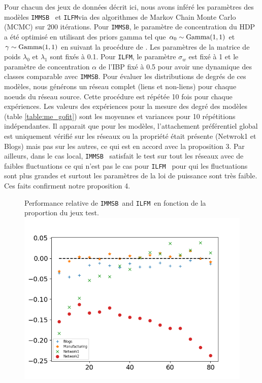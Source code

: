 \documentclass[french]{hermes-journal}
\renewcommand{\text}{\textnormal}
\newcommand{\ilfm}{\texttt{ILFM}}
\newcommand{\immsb}{\texttt{IMMSB}}
\begin{document}
Pour chacun des jeux de données décrit ici, nous avons inféré les paramètres des modèles \immsb~ et \ilfm via des algorithmes de Markov Chain Monte Carlo (MCMC) sur 200 itérations. Pour \immsb, le paramètre de concentration du HDP a été optimisé en utilisant des priors gamma tel que $\alpha_0 \sim \text{Gamma}(1,1)$ et $\gamma \sim \text{Gamma}(1,1)$ en suivant la procédure de \cite{HDP}. Les paramètres de la matrice de poids $\lambda_0$ et $\lambda_1$ sont fixés à 0.1. Pour \ilfm, le paramètre $\sigma_w$ est fixé à 1 et le paramètre de concentration $\alpha$ de l'IBP fixé à 0.5 pour avoir une dynamique des classes comparable avec \immsb. Pour évaluer les distributions de degrés de ces modèles, nous générons un réseau complet (liens et non-liens) pour chaque noeuds du réseau source. Cette procédure est répétée 10 fois pour chaque expériences. Les valeurs des expériences pour la mesure des degré des modèles (table \ref{table:me_gofit}) sont les moyennes et variances pour 10 répétitions indépendantes. 
Il apparait que pour les modèles, l'attachement préférentiel global est uniquement vérifié sur les réseaux ou la propriété était présente (Netwrok1 et Blogs) mais pas sur les autres, ce qui est en accord avec la proposition 3. Par ailleurs, dans le cas local, \immsb~ satisfait le test sur tout les réseaux avec de faibles fluctuations ce qui n'est pas le cas pour \ilfm~ pour qui les fluctuations sont plus grandes et surtout les paramètres de la loi de puissance sont très faible. Ces faits confirment notre proposition 4.





\begin{figure}[h] {Performance relative de \immsb\ and \ilfm\ en fonction de la proportion du jeux test.} 
        \includegraphics[scale=0.45]{img/corpus/testset_max_20.png}
\label{fig:auc}
\end{figure}
\end{document}
